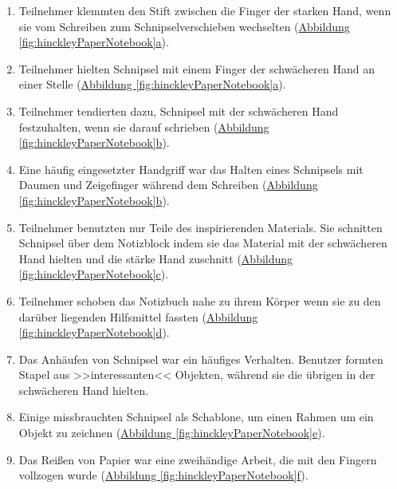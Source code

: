 \medskip \begin{enumerate}
	\item Teilnehmer klemmten den Stift zwischen die Finger der starken Hand, wenn sie vom Schreiben zum Schnipselverschieben wechselten (\hyperref[fig:hinckleyPaperNotebook]{Abbildung \ref*{fig:hinckleyPaperNotebook}a}).
	\item Teilnehmer hielten Schnipsel mit einem Finger der schwächeren Hand an einer Stelle (\hyperref[fig:hinckleyPaperNotebook]{Abbildung \ref*{fig:hinckleyPaperNotebook}a}).
	\item Teilnehmer tendierten dazu, Schnipsel mit der schwächeren Hand festzuhalten, wenn sie darauf schrieben (\hyperref[fig:hinckleyPaperNotebook]{Abbildung \ref*{fig:hinckleyPaperNotebook}b}).
	\item Eine häufig eingesetzter Handgriff war das Halten eines Schnipsels mit Daumen und Zeigefinger während dem Schreiben (\hyperref[fig:hinckleyPaperNotebook]{Abbildung \ref*{fig:hinckleyPaperNotebook}b}).
	\item Teilnehmer benutzten nur Teile des inspirierenden Materials. Sie schnitten Schnipsel über dem Notizblock indem sie das Material mit der schwächeren Hand hielten und die stärke Hand zuschnitt (\hyperref[fig:hinckleyPaperNotebook]{Abbildung \ref*{fig:hinckleyPaperNotebook}c}).
	\item Teilnehmer schoben das Notizbuch nahe zu ihrem Körper wenn sie zu den darüber liegenden Hilfsmittel fassten (\hyperref[fig:hinckleyPaperNotebook]{Abbildung \ref*{fig:hinckleyPaperNotebook}d}).
	\item Das Anhäufen von Schnipsel war ein häufiges Verhalten. Benutzer formten Stapel aus >>interessanten<< Objekten, während sie die übrigen in der schwächeren Hand hielten.
	\item Einige missbrauchten Schnipsel als Schablone, um einen Rahmen um ein Objekt zu zeichnen (\hyperref[fig:hinckleyPaperNotebook]{Abbildung \ref*{fig:hinckleyPaperNotebook}e}).
	\item Das Reißen von Papier war eine zweihändige Arbeit, die mit den Fingern vollzogen wurde (\hyperref[fig:hinckleyPaperNotebook]{Abbildung \ref*{fig:hinckleyPaperNotebook}f}).
\end{enumerate}

\begin{flushright} \citep{Hinckley:2010} \end{flushright}

